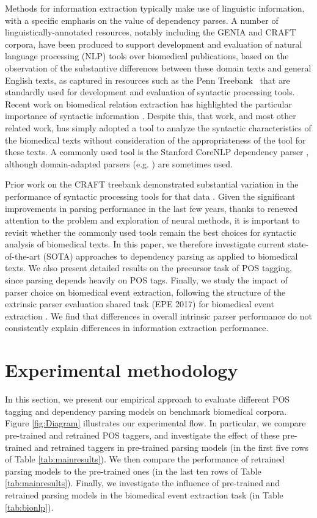 \documentclass[twocolumn,hyperref]{bmcart}\pdfoutput=1
\newcommand{\CHANGEA}[1]{#1}
\begin{document}
Methods for information extraction typically make use of linguistic information, with a specific emphasis on the value of  dependency parses. A number of linguistically-annotated resources, notably including the GENIA \cite{I05-2038} and CRAFT \cite{Verspoor2012} corpora, have been produced to support development and evaluation of natural language processing (NLP) tools over biomedical publications, based on the observation of the substantive differences between these domain texts and general English texts, as captured in resources such as the Penn Treebank~\cite{Marcus93building} that are standardly used for development and evaluation of syntactic processing tools. Recent work on biomedical relation extraction has highlighted the particular importance of syntactic information \cite{TACL1028}. Despite this, that work, and most other related work, has simply adopted a tool to analyze the syntactic characteristics of the biomedical texts without consideration of the appropriateness of the tool for these texts. A commonly used tool is the Stanford CoreNLP dependency parser \cite{D14-1082}, although domain-adapted parsers (e.g.  \cite{mcclosky2008self}) are  sometimes used.

Prior work on the CRAFT treebank demonstrated substantial variation in the performance of syntactic processing tools for that data \cite{Verspoor2012}.
Given the significant improvements in parsing performance in the last few years, thanks to renewed attention to the problem and exploration of neural methods, it is important to revisit whether the commonly used tools remain the best choices for syntactic analysis of biomedical texts. In this paper, we therefore investigate current state-of-the-art (SOTA) approaches to dependency parsing as applied to biomedical texts. We also present detailed results on the precursor task of POS tagging, since parsing depends heavily on POS tags. 
Finally, we study the impact of parser choice on biomedical event extraction, following the structure of the extrinsic parser evaluation shared task (EPE 2017) for biomedical event extraction   \cite{epe2017bio}. We find that differences in overall intrinsic parser performance do not consistently explain differences in information extraction performance. 



\section*{Experimental methodology}

In this section, we present our empirical approach to evaluate different POS tagging and dependency parsing models  on benchmark biomedical corpora. \CHANGEA{Figure \ref{fig:Diagram} illustrates our experimental flow. In particular, we compare pre-trained and retrained POS taggers, and  investigate the effect of these pre-trained and retrained taggers in pre-trained parsing models (in the first five rows of Table \ref{tab:mainresults}). We then compare the performance of retrained parsing models to the pre-trained ones (in the last ten rows of Table \ref{tab:mainresults}). Finally, 
we investigate the influence of pre-trained and retrained parsing models in the biomedical   event extraction task (in Table \ref{tab:bionlp}).}
\end{document}
